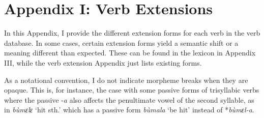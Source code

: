 \renewcommand{\thechapter}{\Roman{chapter}} 

\setcounter{chapter}{1}

\setcounter{section}{0}


\chapter*{Appendix I: Verb Extensions} 
\label{sec:AppendixI}

\pagestyle{plain}

In this Appendix, I provide the different extension forms for each verb in the verb database. In some cases, certain extension forms yield a semantic shift or a meaning different than expected.  These can be found in the lexicon in Appendix III, while the verb extension Appendix  just lists existing forms.

As a notational convention, I do not indicate morpheme breaks when  they are opaque. This is, for instance, the case with some passive forms of trisyllabic verbs where the passive -{\itshape a} also affects the penultimate vowel of the second syllable, as in {\itshape bùmɛlɛ} `hit sth.'  which has a passive form {\itshape bùmala} `be hit' instead of *{\itshape bùmɛl-a}.

